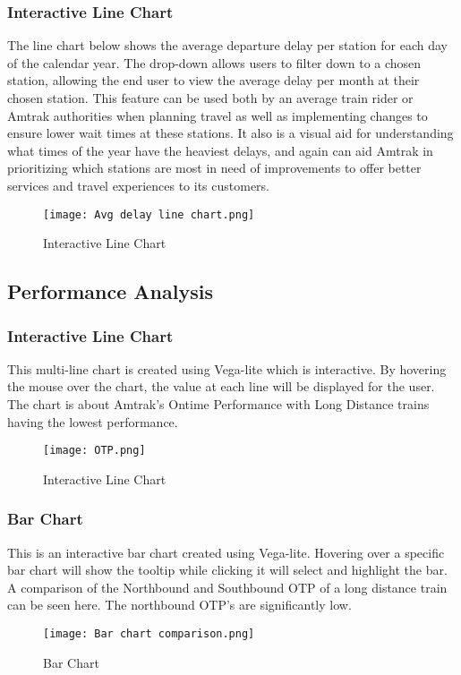 \documentclass[runningheads]{llncs}
\begin{document}
\subsubsection{Interactive Line Chart}
The line chart below shows the average departure delay per station for each day of the calendar year. The drop-down allows users to filter down to a chosen station, allowing the end user to view the average delay per month at their chosen station. This feature can be used both by an average train rider or Amtrak authorities when planning travel as well as implementing changes to ensure lower wait times at these stations. It also is a visual aid for understanding what times of the year have the heaviest delays, and again can aid Amtrak in prioritizing which stations are most in need of improvements to offer better services and travel experiences to its customers.
\begin{figure}
    \centering
    \texttt{[image: Avg delay line chart.png]}
    \caption{Interactive Line Chart}
    \label{fig:5}
\end{figure}

\subsection{Performance Analysis}
\subsubsection{Interactive Line Chart}
This multi-line chart is created using Vega-lite which is interactive. By hovering the mouse over the chart, the value at each line will be displayed for the user. The chart is about Amtrak's Ontime Performance with Long Distance trains having the lowest performance.
\begin{figure}
    \centering
    \texttt{[image: OTP.png]}
    \caption{Interactive Line Chart}
    \label{fig:6}
\end{figure}
\subsubsection{Bar Chart}
This is an interactive bar chart created using Vega-lite. Hovering over a specific bar chart will show the tooltip while clicking it will select and highlight the bar. A comparison of the Northbound and Southbound OTP of a long distance train can be seen here. The northbound OTP's are significantly low.
\begin{figure}
    \centering
    \texttt{[image: Bar chart comparison.png]}
    \caption{Bar Chart}
    \label{fig:7}
\end{figure}
\end{document}
